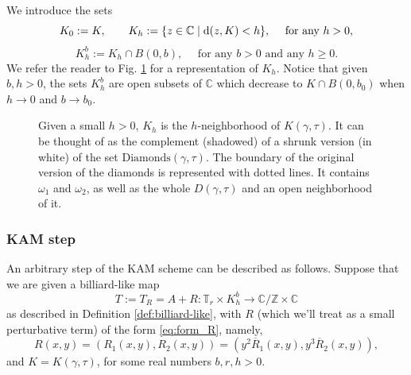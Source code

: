 \documentclass[10pt]{article}
\newcommand{\Z}{\mathbb{Z}}
\newcommand{\R}{\mathbb{R}}
\newcommand{\C}{\mathbb{C}}
\newcommand{\T}{\mathbb{T}}
\newcommand{\CC}{\mathbb{C}}
\begin{document}
\noindent We introduce the sets
\[K_0:= K, \qquad K_h := \{z \in \CC \mid \textup{d}(z, K) < h \}, \quad \text{ for any } h > 0,\]
\[K_h^b:= K_h \cap B(0, b), \quad \text{ for any } b > 0 \text{ and any } h \geq 0.\]
We refer the reader to Fig. \ref{fig:neighborhood_diamonds} for a representation of $K_h$.
Notice that given $b, h>0$, the sets $K_h^b$ are open subsets of $\C$ which decrease to $K\cap B(0,b_0)$ when $h\to 0$ and $b\to b_0$.

\begin{figure}[h!]
    \centering
\usetikzlibrary{arrows}
    \caption{Given a small $h>0$, $K_h$ is the $h$-neighborhood of $K(\gamma,\tau)$. It can be thought of as the complement (shadowed) of a shrunk version (in white) of the set $\text{Diamonds}(\gamma,\tau)$. The boundary of the original version of the diamonds is represented with dotted lines. It contains $\omega_1$ and $\omega_2$, as well as the whole $D(\gamma,\tau)$ and an open neighborhood of it.}
    \label{fig:neighborhood_diamonds}
\end{figure}


\subsubsection*{KAM step} An arbitrary step of the KAM scheme can be described as follows. Suppose that we are given a billiard-like map 
\[
T := T_R = A + R:\T_{r}\times K^{b}_{h}\to \C/\Z \times \C
\]
as described in Definition \ref{def:billiard-like}, with $R$ (which we'll treat as a small perturbative term) of the form \eqref{eq:form_R}, namely, 
\[  R(x, y) = (R_1(x, y), R_2(x, y)) = (y^2 \overline R_1(x, y), y^3 \overline R_2(x, y)), \]
and $K = K(\gamma ,\tau)$, for some real numbers $b, r, h>0$.
\end{document}
